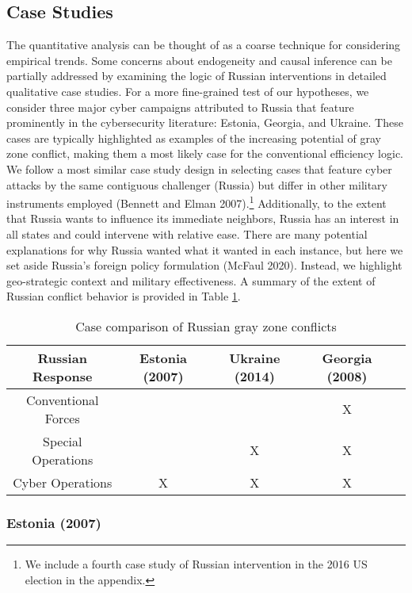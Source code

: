 \documentclass[
]{article}
\begin{document}
\hypertarget{case-studies}{%
\subsection{Case Studies}\label{case-studies}}

The quantitative analysis can be thought of as a coarse technique for considering empirical trends. Some concerns about endogeneity and causal inference can be partially addressed by examining the logic of Russian interventions in detailed qualitative case studies. For a more fine-grained test of our hypotheses, we consider three major cyber campaigns attributed to Russia that feature prominently in the cybersecurity literature: Estonia, Georgia, and Ukraine. These cases are typically highlighted as examples of the increasing potential of gray zone conflict, making them a most likely case for the conventional efficiency logic. We follow a most similar case study design in selecting cases that feature cyber attacks by the same contiguous challenger (Russia) but differ in other military instruments employed (Bennett and Elman 2007).\footnote{We include a fourth case study of Russian intervention in the 2016 US election in the appendix.} Additionally, to the extent that Russia wants to influence its immediate neighbors, Russia has an interest in all states and could intervene with relative ease. There are many potential explanations for why Russia wanted what it wanted in each instance, but here we set aside Russia's foreign policy formulation (McFaul 2020). Instead, we highlight geo-strategic context and military effectiveness. A summary of the extent of Russian conflict behavior is provided in Table \ref{table:russia}.

\begin{table}[h]
    \centering
    \begin{tabular}{|c||c|c|c|c|}
  \hline
  \textbf{Russian Response} & Estonia (2007) & Ukraine (2014) & Georgia (2008) \\
  \hline
  Conventional Forces  &  &  &  X  \\
    \hline
  Special Operations  &  & X & X \\
    \hline
    Cyber Operations & X & X & X \\
    \hline
    \end{tabular}
  \caption{Case comparison of Russian gray zone conflicts}
    \label{table:russia}
\end{table}

\hypertarget{estonia-2007}{%
\subsubsection{Estonia (2007)}\label{estonia-2007}}
\end{document}
